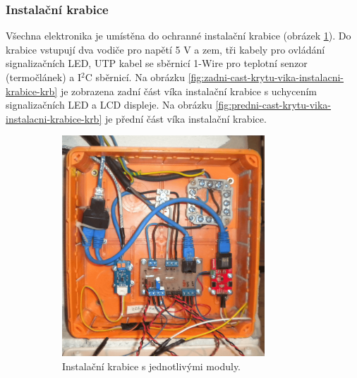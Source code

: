 \newpage
\subsubsection{Instalační krabice}
Všechna elektronika je umístěna do ochranné instalační krabice (obrázek \ref{fig:instalacni-krabice-vnitrek-krb}). Do krabice vstupují dva vodiče pro napětí 5 V a zem, tři kabely pro ovládání signalizačních LED, UTP kabel se sběrnicí 1-Wire pro teplotní senzor (termočlánek) a I$^2$C sběrnicí. Na obrázku \ref{fig:zadni-cast-krytu-vika-instalacni-krabice-krb} je zobrazena zadní část víka instalační krabice s uchycením signalizačních LED a LCD displeje. Na obrázku \ref{fig:predni-cast-krytu-vika-instalacni-krabice-krb} je přední část víka instalační krabice.

\begin{figure}[H]
\centering
\begin{subfigure}{.5\textwidth}
  \centering
  \includegraphics[width=0.835\textwidth]{images/krb/instalacni-krabice-vnitrek-krb.png}
  \caption{Instalační krabice s jednotlivými moduly.}
  \label{fig:instalacni-krabice-vnitrek-krb}
\end{subfigure}%
\begin{subfigure}{.5\textwidth}
  \centering

\end{subfigure}
\end{figure}

